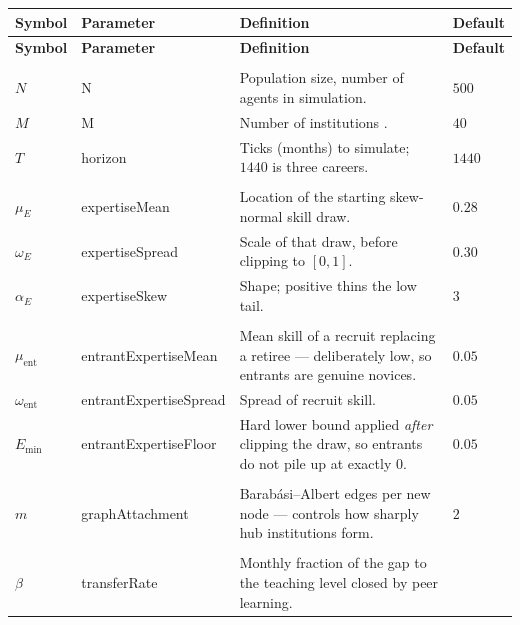 \documentclass[11pt]{article}
\begin{document}
\noindent\footnotesize
\begin{longtable}{L{1.6cm} K{2.9cm} L{6.8cm} S{2.5cm}}
\toprule
\textbf{Symbol} & \textnormal{\textbf{Parameter}} & \textbf{Definition} &
\textbf{Default} \\
\midrule
\endfirsthead
\toprule
\textbf{Symbol} & \textnormal{\textbf{Parameter}} & \textbf{Definition} &
\textbf{Default} \\
\midrule
\endhead
\bottomrule
\endlastfoot
{}\\[2pt]
$N$ & N & Population size, number of agents in simulation.
  & $500$ \\
$M$ & M & Number of institutions .
  & $40$ \\
$T$ & horizon & Ticks (months) to simulate; $1440$ is three careers.
  & $1440$ \\
\addlinespace
{}\\[2pt]
$\mu_E$ & expertiseMean & Location of the starting skew-normal skill draw.
  & $0.28$ \\
$\omega_E$ & expertiseSpread & Scale of that draw, before clipping to $[0,1]$.
  & $0.30$ \\
$\alpha_E$ & expertiseSkew & Shape; positive thins the low tail.
  & $3$ \\
\addlinespace
{}\\[2pt]
$\mu_{\text{ent}}$ & entrantExpertiseMean & Mean skill of a recruit replacing a
  retiree --- deliberately low, so entrants are genuine novices.
  & $0.05$ \\
$\omega_{\text{ent}}$ & entrantExpertiseSpread & Spread of recruit skill.
  & $0.05$ \\
$E_{\min}$ & entrantExpertiseFloor & Hard lower bound applied \emph{after}
  clipping the draw, so entrants do not pile up at exactly $0$.
  & $0.05$ \\
\addlinespace
{}\\[2pt]
$m$ & graphAttachment & Barab\'asi--Albert edges per new node --- controls how
  sharply hub institutions form.
  & $2$ \\
\addlinespace
{}\\[2pt]
$\beta$ & transferRate & Monthly fraction of the gap to the teaching level closed
  by peer learning.

\end{longtable}
\end{document}

